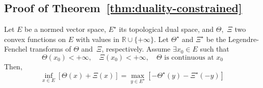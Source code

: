 \documentclass[10pt]{article}
\newcommand{\real}{\mathbb{R}}
\numberwithin{equation}{section}
\begin{document}
\subsection{Proof of Theorem~\ref{thm:duality-constrained}}\label{apdx:duality-proof}
	\begin{theorem} \label{thm:min-max}
	Let $E$ be a normed vector space, $E^\star$ its topological dual space, and $\Theta$,~$\Xi$ two convex functions on $E$ with values in $\real \cup \{+\infty\}$. Let $\Theta^\star$ and $\Xi^\star$ be the Legendre-Fenchel transforms of $\Theta$ and~$\Xi$, respectively. Assume $\exists x_0 \in E$ such that 
	\begin{equation*}
	\Theta(x_0)< +\infty, \quad \Xi(x_0)< +\infty,\quad \Theta \text{ is continuous at } x_0
	\end{equation*}
	Then,
	\begin{equation}\label{eq:min-max}
	\inf_{x\in E} \left[\Theta(x)+\Xi(x)\right] = \max_{y \in E^\star}\left[-\Theta^\star(y) - \Xi^\star(-y)\right]
	\end{equation}
\end{theorem}
\end{document}
